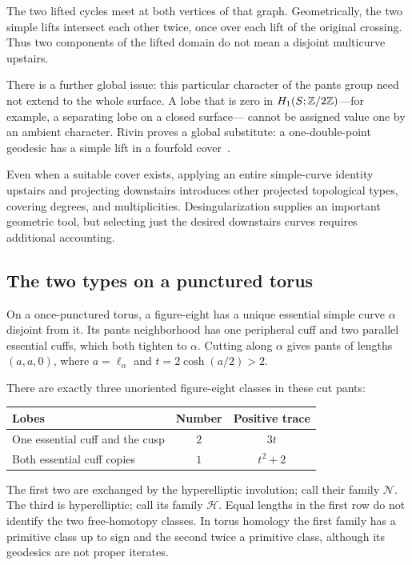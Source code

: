 The two lifted cycles meet at both vertices of that graph. Geometrically,
the two simple lifts intersect each other twice, once over each lift of
the original crossing. Thus two components of the lifted domain do not
mean a disjoint multicurve upstairs.

There is a further global issue: this particular character of the pants
group need not extend to the whole surface. A lobe that is zero in
$H_1(S;\mathbb Z/2\mathbb Z)$---for example, a separating lobe on a closed surface---
cannot be assigned value one by an ambient character.
Rivin proves a global substitute: a one-double-point geodesic has a simple
lift in a fourfold cover~\cite[Theorem 4.2]{RivinFigures}.

Even when a suitable cover exists, applying an entire simple-curve identity
upstairs and projecting downstairs introduces other projected topological
types, covering degrees, and multiplicities. Desingularization supplies
an important geometric tool, but selecting just the desired downstairs
curves requires additional accounting.

\subsection{The two types on a punctured torus}

On a once-punctured torus, a figure-eight has a unique essential simple
curve $\alpha$ disjoint from it. Its pants neighborhood has one peripheral
cuff and two parallel essential cuffs, which both tighten to $\alpha$.
Cutting along $\alpha$ gives pants of lengths $(a,a,0)$, where
$a=\ell_\alpha$ and $t=2\cosh(a/2)>2$.

There are exactly three unoriented figure-eight classes in these cut pants:
\begin{center}
\begin{tabular}{@{}p{}c c@{}}
\toprule
Lobes & Number & Positive trace\\
\midrule
One essential cuff and the cusp & $2$ & $3t$\\
Both essential cuff copies & $1$ & $t^2+2$\\
\bottomrule
\end{tabular}
\end{center}
The first two are exchanged by the hyperelliptic involution; call their
family $\mathcal N$. The third is hyperelliptic; call its family
$\mathcal H$. Equal lengths in the first row do not identify the two
free-homotopy classes. In torus homology the first family has a primitive
class up to sign and the second twice a primitive class, although its
geodesics are not proper iterates.

